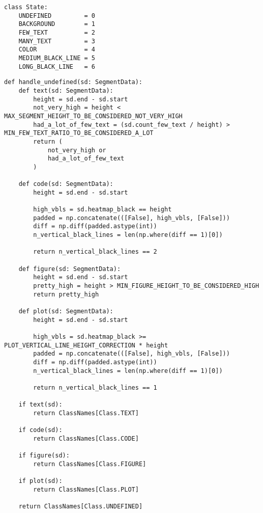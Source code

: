 \begin{lstlisting}[caption={Структура State}, label={lst:state}]
class State:
    UNDEFINED         = 0
    BACKGROUND        = 1
    FEW_TEXT          = 2
    MANY_TEXT         = 3
    COLOR             = 4
    MEDIUM_BLACK_LINE = 5
    LONG_BLACK_LINE   = 6
\end{lstlisting}

\begin{lstlisting}[caption={Функция handle\_undefined}, label={lst:hundef}]
def handle_undefined(sd: SegmentData):
    def text(sd: SegmentData):
        height = sd.end - sd.start
        not_very_high = height < MAX_SEGMENT_HEIGHT_TO_BE_CONSIDERED_NOT_VERY_HIGH
        had_a_lot_of_few_text = (sd.count_few_text / height) > MIN_FEW_TEXT_RATIO_TO_BE_CONSIDERED_A_LOT
        return (
            not_very_high or
            had_a_lot_of_few_text
        )

    def code(sd: SegmentData):
        height = sd.end - sd.start

        high_vbls = sd.heatmap_black == height
        padded = np.concatenate(([False], high_vbls, [False]))
        diff = np.diff(padded.astype(int))
        n_vertical_black_lines = len(np.where(diff == 1)[0])

        return n_vertical_black_lines == 2

    def figure(sd: SegmentData):
        height = sd.end - sd.start
        pretty_high = height > MIN_FIGURE_HEIGHT_TO_BE_CONSIDERED_HIGH
        return pretty_high

    def plot(sd: SegmentData):
        height = sd.end - sd.start

        high_vbls = sd.heatmap_black >= PLOT_VERTICAL_LINE_HEIGHT_CORRECTION * height
        padded = np.concatenate(([False], high_vbls, [False]))
        diff = np.diff(padded.astype(int))
        n_vertical_black_lines = len(np.where(diff == 1)[0])

        return n_vertical_black_lines == 1

    if text(sd):
        return ClassNames[Class.TEXT]

    if code(sd):
        return ClassNames[Class.CODE]

    if figure(sd):
        return ClassNames[Class.FIGURE]

    if plot(sd):
        return ClassNames[Class.PLOT]

    return ClassNames[Class.UNDEFINED]
\end{lstlisting}

